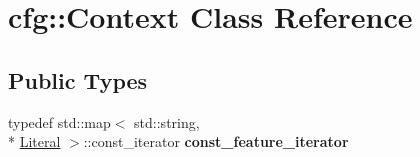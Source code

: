 \hypertarget{classcfg_1_1Context}{\section{cfg\-:\-:Context Class Reference}
\label{classcfg_1_1Context}
}
\subsection*{Public Types}
\begin{DoxyCompactItemize}
\item 
\hypertarget{classcfg_1_1Context_a2795b6ffdf6481f708701e2233a574d2}{typedef std\-::map$<$ std\-::string, \\*
\hyperlink{classcfg_1_1Literal}{Literal} $>$\-::const\-\_\-iterator {\bfseries const\-\_\-feature\-\_\-iterator}}\label{classcfg_1_1Context_a2795b6ffdf6481f708701e2233a574d2}

\end{DoxyCompactItemize}

